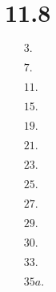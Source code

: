 \documentclass[12pt]{article}
\begin{document}
\section{11.8}
\begin{enumerate}
    \item[$3.$]
    \item[$7.$]
    \item[$11.$]
    \item[$15.$]
    \item[$19.$]
    \item[$21.$]
    \item[$23.$]
    \item[$25.$]
    \item[$27.$]
    \item[$29.$]
    \item[$30.$]
    \item[$33.$]
    \item[$35a.$]
\end{enumerate}
\end{document}
